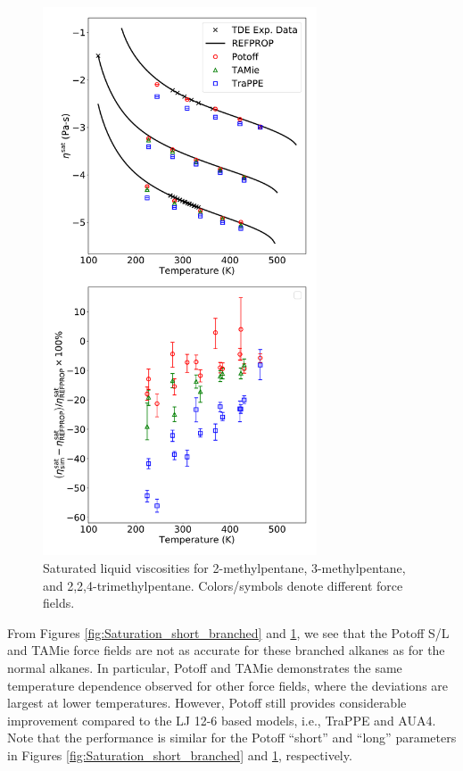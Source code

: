 \documentclass[preprint,review,12pt]{elsarticle}
\begin{document}
	\begin{figure}[htb!]
		\centering
		\includegraphics[width=3.2in]{compare_force_fields_long_branched.pdf}
		\caption{Saturated liquid viscosities for 2-methylpentane, 3-methylpentane, and 2,2,4-trimethylpentane. Colors/symbols denote different force fields.}
		\label{fig:Saturation_long_branched}
	\end{figure} 
	
	From Figures \ref{fig:Saturation_short_branched} and \ref{fig:Saturation_long_branched}, we see that the Potoff S/L and TAMie force fields are not as accurate for these branched alkanes as for the normal alkanes. In particular, Potoff and TAMie demonstrates the same temperature dependence observed for other force fields, where the deviations are largest at lower temperatures. However, Potoff still provides considerable improvement compared to the LJ 12-6 based models, i.e., TraPPE and AUA4. Note that the performance is similar for the Potoff ``short'' and ``long'' parameters in Figures \ref{fig:Saturation_short_branched} and \ref{fig:Saturation_long_branched}, respectively. 
	
\end{document}

